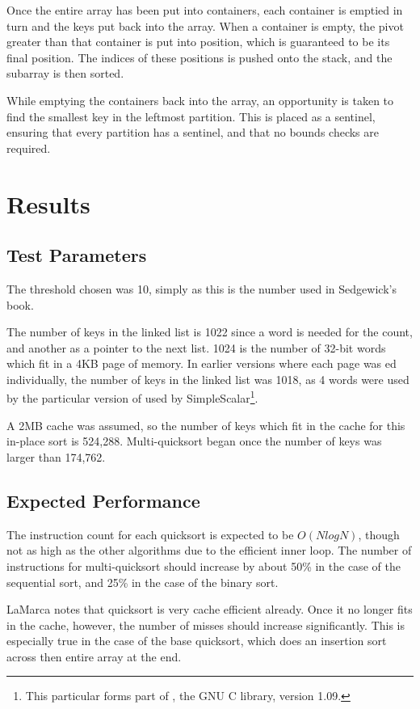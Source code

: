 Once the entire array has been put into containers, each container is emptied
in turn and the keys put back into the array. When a container is empty, the
pivot greater than that container is put into position, which is guaranteed to
be its final position.  The indices of these positions is pushed onto the
stack, and the subarray is then sorted.

While emptying the containers back into the array, an opportunity is taken to
find the smallest key in the leftmost partition. This is placed as a sentinel,
ensuring that every partition has a sentinel, and that no bounds checks are
required.

\section{Results}

\subsection{Test Parameters}
The threshold chosen was 10, simply as this is the number used in Sedgewick's
book.

The number of keys in the linked list is 1022 since a word is needed for the
count, and another as a pointer to the next list. 1024 is the number of 32-bit
words which fit in a 4KB page of memory. In earlier versions where each page was
ed individually, the number of keys in the linked list was 1018,
as 4 words were used by the particular version of  used by
SimpleScalar\footnote{This particular  forms part of
, the GNU C library, version 1.09.}.

A 2MB cache was assumed, so the number of keys which fit in the cache for this
in-place sort is 524,288. Multi-quicksort began once the number of keys was
larger than 174,762.

\subsection{Expected Performance}
The instruction count for each quicksort is expected to be $O(NlogN)$,
though not as high as the other algorithms due to the efficient inner loop.
The number of instructions for multi-quicksort should increase by about 50\% in
the case of the sequential sort, and 25\% in the case of the binary sort.

LaMarca notes that quicksort is very cache efficient already. Once it no longer
fits in the cache, however, the number of misses should increase significantly.
This is especially true in the case of the base quicksort, which does an
insertion sort across then entire array at the end.


